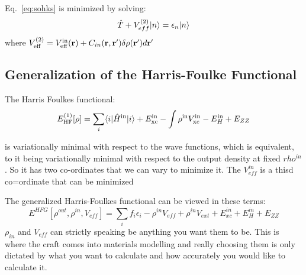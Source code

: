 Eq.~\ref{eq:sohks} is minimized by solving:
%
\begin{equation}
\hat{T} + V_{eff}^{(2)}|n\rangle= \epsilon_{n}|n\rangle
\end{equation}
%
where $V_{\rm eff}^{(2)}=V^{\rm in}_{\rm eff}({\bf r}) + C_{in}({\bf r},{\bf r}')\delta \rho({\bf r}')d{\bf r}'$

%

\subsection{Generalization of the Harris-Foulke Functional}

The Harris Foulkes functional:
%
\begin{equation}
E^{(1)}_{\rm HF}[\rho] = \sum_{i} \langle i |\hat{H}^{\rm in}|i\rangle + E_{\rm xc}^{\rm in} - \int \rho^{\rm in}V^{\rm in}_{\rm xc} - E^{\rm in}_{H} + E_{ZZ}
\end{equation}

is variationally minimal with respect to the wave functions, which is equivalent, to it being variationally minimal
with respect to the output density at fixed $rho^{in}$. So it has two co-ordinates that
we can vary to minimize it. The $V^{in}_{eff}$ is a thisd co=ordinate that can be minimized

The generalized Harris-Foulkes functional can be viewed in these terms:
%
\begin{equation}
E^{HFG}[\rho^{out}, \rho^{in}, V_{eff}] = \sum_{i}f_{i}\epsilon_{i}-\rho^{in}V_{eff}+\rho^{in}V_{ext}+E_{xc}^{in}+E_{H}^{in}+E_{ZZ}
\end{equation}
%
$\rho_{in}$ and $V_{eff}$ can strictly speaking be anything you want them to be. This is where the 
craft comes into materials modelling and really choosing them is only dictated by what you
want to calculate and how accurately you would like to calculate it. 

